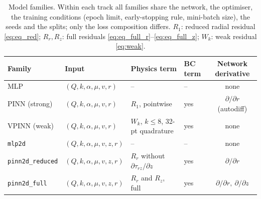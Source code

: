 \documentclass[subscriptcorrection,upint,varvw,barcolor=Goldenrod3,mathalfa=cal=euler,balance,hyphenate,french,pdf-a]{asmejour} %
\begin{document}
\begin{table}[t]
\caption{Model families. Within each track all families share the network, the
optimiser, the training conditions (epoch limit, early-stopping rule,
mini-batch size), the seeds and the splits; only the loss composition differs.
$R_1$: reduced radial residual
\eqref{eq:eq_red}; $R_r,R_z$: full residuals
\eqref{eq:eq_full_r}--\eqref{eq:eq_full_z}; $W_k$: weak residual \eqref{eq:weak}.}
\label{tab:families}
\centering\small
\begin{tabular}{@{}llllc@{}}
\toprule
Family & Input & Physics term & BC term & Network derivative \\
\midrule
MLP                     & $(Q,k,\alpha,\mu,v,r)$   & --                                        & --  & none \\
PINN (strong)           & $(Q,k,\alpha,\mu,v,r)$   & $R_1$, pointwise                          & yes & $\partial/\partial r$ (autodiff) \\
VPINN (weak)            & $(Q,k,\alpha,\mu,v,r)$   & $W_k$, $k\le8$, 32-pt quadrature          & yes & none \\
\texttt{mlp2d}          & $(Q,k,\alpha,\mu,v,z,r)$ & --                                        & --  & none \\
\texttt{pinn2d\_reduced}& $(Q,k,\alpha,\mu,v,z,r)$ & $R_r$ without $\partial\tau_{rz}/\partial z$ & yes & $\partial/\partial r$ \\
\texttt{pinn2d\_full}   & $(Q,k,\alpha,\mu,v,z,r)$ & $R_r$ and $R_z$, full                     & yes & $\partial/\partial r,\ \partial/\partial z$ \\
\bottomrule
\end{tabular}
\end{table}
\end{document}
